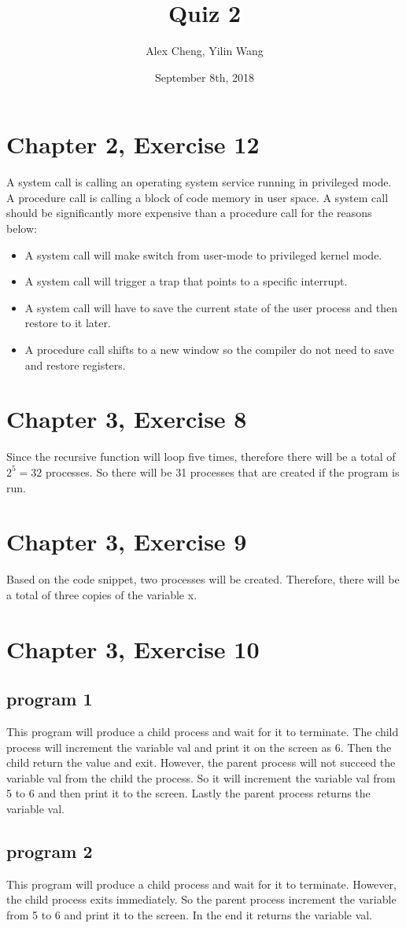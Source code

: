 \documentclass[12pt]{article}
\title{Quiz 2}
\author{Alex Cheng, Yilin Wang}
\date{September 8th, 2018}
\begin{document}
\maketitle
\section{Chapter 2, Exercise 12}
A system call is calling an operating system service running in privileged mode. A procedure call is calling a block of code memory in user space. A system call should be significantly more expensive than a procedure call for the reasons below:
\begin{itemize}
\item A system call will make switch from user-mode to privileged kernel mode.
\item A system call will trigger a trap that points to a specific interrupt.
\item A system call will have to save the current state of the user process and then restore to it later.
\item A procedure call shifts to a new window so the compiler do not need to save and restore registers.
\end{itemize}

\section{Chapter 3, Exercise 8}
Since the recursive function will loop five times, therefore there will be a total of $2^5=32$ processes. So there will be 31 processes that are created if the program is run.
\section{Chapter 3, Exercise 9}
Based on the code snippet, two processes will be created. Therefore, there will be a total of three copies of the variable x.
\section{Chapter 3, Exercise 10}
\subsection{program 1}
This program will produce a child process and wait for it to terminate. The child process will increment the variable val and print it on the screen as 6. Then the child return the value and exit. However, the parent process will not succeed the variable val from the child the process. So it will increment the variable val from 5 to 6 and then print it to the screen. Lastly the parent process returns the variable val.
\subsection{program 2}
This program will produce a child process and wait for it to terminate. However, the child process exits immediately. So the parent process increment the variable from 5 to 6 and print it to the screen. In the end it returns the variable val.
\end{document}
